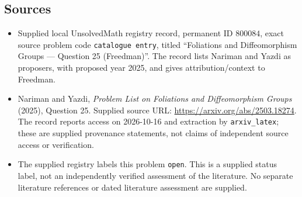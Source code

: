 \documentclass[11pt]{article}
\begin{document}
\subsection{Sources}
\begin{itemize}
\item Supplied local UnsolvedMath registry record, permanent ID \(800084\), exact source problem code \texttt{catalogue entry}, titled ``Foliations and Diffeomorphism Groups --- Question 25 (Freedman)''. The record lists Nariman and Yazdi as proposers, with proposed year 2025, and gives attribution/context to Freedman.
\item Nariman and Yazdi, \emph{Problem List on Foliations and Diffeomorphism Groups} (2025), Question 25. Supplied source URL: \url{https://arxiv.org/abs/2503.18274}. The record reports access on 2026-10-16 and extraction by \texttt{arxiv\_latex}; these are supplied provenance statements, not claims of independent source access or verification.
\item The supplied registry labels this problem \texttt{open}. This is a supplied status label, not an independently verified assessment of the literature. No separate literature references or dated literature assessment are supplied.
\end{itemize}
\end{document}
